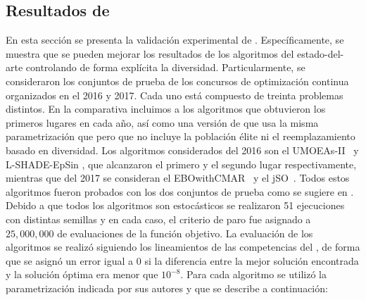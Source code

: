 \subsection{Resultados de \DEEDM{} }
En esta sección se presenta la validación experimental de \DEEDM{}.
%
Específicamente, se muestra que se pueden mejorar los resultados de los algoritmos del estado-del-arte controlando de forma explícita
la diversidad.
%
Particularmente, se consideraron los conjuntos de prueba de los concursos de optimización continua organizados en el \CEC{} 2016 y \CEC{} 2017.
%
Cada uno está compuesto de treinta problemas distintos.
%
En la comparativa incluimos a los algoritmos que obtuvieron los primeros lugares en cada año, así como una versión de \DE{} que usa la misma
parametrización que \DEEDM{} pero que no incluye la población élite ni el reemplazamiento basado en diversidad.
%
Los algoritmos considerados del \CEC{} 2016 son el UMOEAs-II~\cite{elsayed2016testing} y L-SHADE-EpSin \cite{awad2016ensemble}, que alcanzaron el primero y el segundo lugar respectivamente,
mientras que del \CEC{} 2017 se consideran el EBOwithCMAR~\cite{kumar2017improving} y el jSO~\cite{brest2017single}.
%
Todos estos algoritmos fueron probados con los dos conjuntos de prueba como se sugiere  en \cite{molina2017analysis}.
%
Debido a que todos los algoritmos son estocásticos se realizaron 51 ejecuciones con distintas semillas
y en cada caso, el criterio de paro fue asignado a $25,000,000$ de evaluaciones de la función objetivo.
%
La evaluación de los algoritmos se realizó siguiendo los lineamientos de las competencias del \CEC{}, de forma que
se asignó un error igual a $0$ si la diferencia entre la mejor solución encontrada y la solución óptima era menor que $10^{-8}$.
%
Para cada algoritmo se utilizó la parametrización indicada por sus autores y que se describe a continuación:

